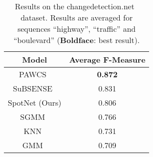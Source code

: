 \documentclass[10pt, conference, compsocconf]{IEEEtran}
\begin{document}
\begin{table}[ht]
\footnotesize
\setlength\tabcolsep{3pt}
\def\arraystretch{1.5}
\centering
\caption{Results on the changedetection.net~\cite{goyette2012changedetection} dataset. Results are averaged for sequences ``highway'', ``traffic'' and ``boulevard'' (\textbf{Boldface}: best result).}
\label{results-changedetection}
\begin{tabular}{c|c}
Model & Average F-Measure \\
\hline
\hline
PAWCS~\cite{st2015self_pawcs} & \textbf{0.872} \\
\hline
SuBSENSE~\cite{st2014subsense}  & 0.831 \\
\hline
SpotNet (Ours) & 0.806 \\
\hline
SGMM~\cite{evangelio2012splitting_sgmm}  & 0.766 \\
\hline
KNN~\cite{zivkovic2006efficient_knn}  & 0.731 \\
\hline
GMM~\cite{stauffer1999adaptive_gmm}  & 0.709 \\
\end{tabular}
\vspace{-4mm}
\end{table}
\end{document}
